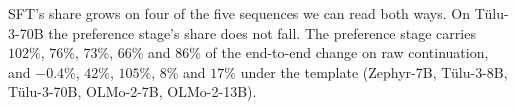 SFT's share grows on four of the five sequences we can read both ways. On Tülu-3-70B the preference stage's share does not fall. The preference stage carries $102\%$, $76\%$, $73\%$, $66\%$ and $86\%$ of the end-to-end change on raw continuation, and $-0.4\%$, $42\%$, $105\%$, $8\%$ and $17\%$ under the template (Zephyr-7B, T\"ulu-3-8B, T\"ulu-3-70B, OLMo-2-7B, OLMo-2-13B).

